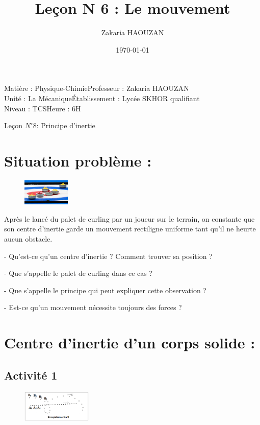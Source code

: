 \documentclass[12pt]{article}
\title{Leçon N 6 : Le mouvement}
\author{Zakaria HAOUZAN}
\date{\today}
\newcommand\headerMe[2]{\noindent{}#1\hfill#2}
\begin{document}
\headerMe{Matière : Physique-Chimie}{Professeur : Zakaria HAOUZAN}\\
\headerMe{Unité : La Mécanique}{Établissement : Lycée SKHOR qualifiant}\\
\headerMe{Niveau : TCS}{Heure : 6H}\\

\begin{center}
    \Large{Leçon $N^{\circ}8$: \color{red} Principe d'inertie }
\end{center}


\section{Situation problème : }

\begin{figure}
\includegraphics[width=0.2\textwidth]{./img/img00.jpeg}
\end{figure}


    Après le lancé du palet de curling par un joueur sur le
terrain, on constante que son centre d’inertie garde un
mouvement rectiligne uniforme tant qu’il ne heurte
aucun obstacle.

- Qu’est-ce qu’un centre d’inertie ? Comment trouver sa position ?

- Que s’appelle le palet de curling dans ce cas ?

- Que s’appelle le principe qui peut expliquer cette observation ?

- Est-ce qu’un mouvement nécessite toujours des forces ?

\section{Centre d’inertie d’un corps solide : }
\subsection{Activité 1 }

\begin{figure}
\includegraphics[width=0.3\textwidth]{./img/img01.png}
\end{figure}
\end{document}
